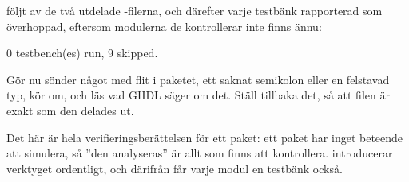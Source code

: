 följt av de två utdelade -filerna, och därefter varje testbänk rapporterad som
överhoppad, eftersom modulerna de kontrollerar inte finns ännu:

\begin{console}
0 testbench(es) run, 9 skipped.
\end{console}

Gör nu sönder något med flit i paketet, ett saknat semikolon eller en felstavad typ, kör om, och läs
vad GHDL säger om det. Ställ tillbaka det, så att filen är exakt som den delades ut.

Det här är hela verifieringsberättelsen för ett paket: ett paket har inget beteende att simulera, så
”den analyseras” är allt som finns att kontrollera.  introducerar verktyget
ordentligt, och därifrån får varje modul en testbänk också.
